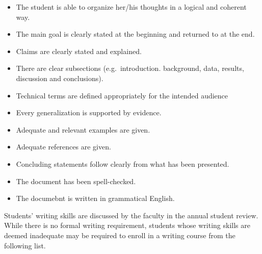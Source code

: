 \documentclass[
]{book}
\providecommand{\tightlist}{%
  \setlength{\itemsep}{0pt}\setlength{\parskip}{0pt}}
\begin{document}
\begin{itemize}
\tightlist
\item
  The student is able to organize her/his thoughts in a logical and coherent way.
\item
  The main goal is clearly stated at the beginning and returned to at the end.
\item
  Claims are clearly stated and explained.
\item
  There are clear subsections (e.g.~introduction. background, data, results, discussion and conclusions).
\item
  Technical terms are defined appropriately for the intended audience
\item
  Every generalization is supported by evidence.
\item
  Adequate and relevant examples are given.
\item
  Adequate references are given.
\item
  Concluding statements follow clearly from what has been presented.
\item
  The document has been spell-checked.
\item
  The documebnt is written in grammatical English.
\end{itemize}

Students' writing skills are discussed by the faculty in the annual student review. While there is no formal writing requirement, students whose writing skills are deemed inadequate may be required to enroll in a writing course from the following list.
\end{document}
